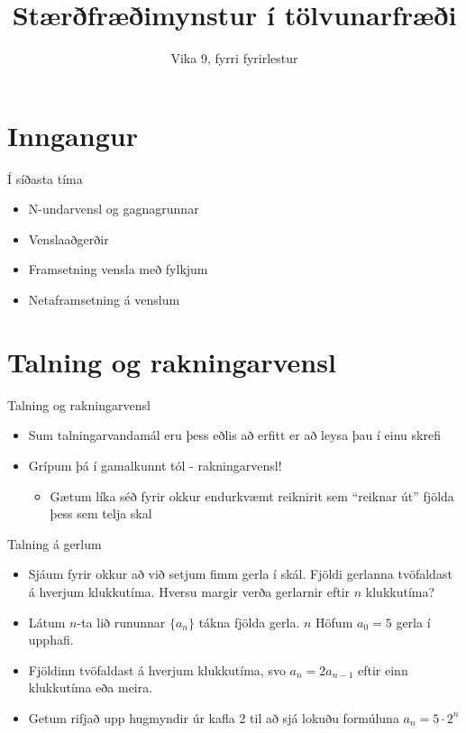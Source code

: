 \documentclass[handout]{beamer}
\title{Stærðfræðimynstur í tölvunarfræði}
\subtitle{Vika 9, fyrri fyrirlestur}
\begin{document}
\begin{frame}
\titlepage
\end{frame}


\section{Inngangur}

\begin{frame}{Í síðasta tíma}
    \begin{itemize}
        \item N-undarvensl og gagnagrunnar
        \item Venslaaðgerðir
        \item Framsetning vensla með fylkjum
        \item Netaframsetning á venslum
    \end{itemize}
\end{frame}

\section{Talning og rakningarvensl}

\begin{frame}{Talning og rakningarvensl}
\begin{itemize}
 \item Sum talningarvandamál eru þess eðlis að erfitt er að leysa þau í einu skrefi
 \item Grípum þá í gamalkunnt tól - rakningarvensl!
 \begin{itemize}
  \item Gætum líka séð fyrir okkur endurkvæmt reiknirit sem ``reiknar út'' fjölda þess sem telja skal
 \end{itemize}
\end{itemize}
\end{frame}

\begin{frame}{Talning á gerlum}
\begin{itemize}[<+->]
 \item Sjáum fyrir okkur að við setjum fimm gerla í skál. Fjöldi gerlanna tvöfaldast á hverjum klukkutíma. Hversu margir verða gerlarnir eftir $n$ klukkutíma?
 \item Látum $n$-ta lið rununnar $\{a_n\}$ tákna fjölda gerla. $n$ Höfum $a_0 = 5$ gerla í upphafi.
 \item Fjöldinn tvöfaldast á hverjum klukkutíma, svo $a_n = 2a_{n-1}$ eftir einn klukkutíma eða meira.
 \item Getum rifjað upp hugmyndir úr kafla 2 til að sjá lokuðu formúluna $a_n = 5\cdot 2^n$
\end{itemize}
\end{frame}
\end{document}
